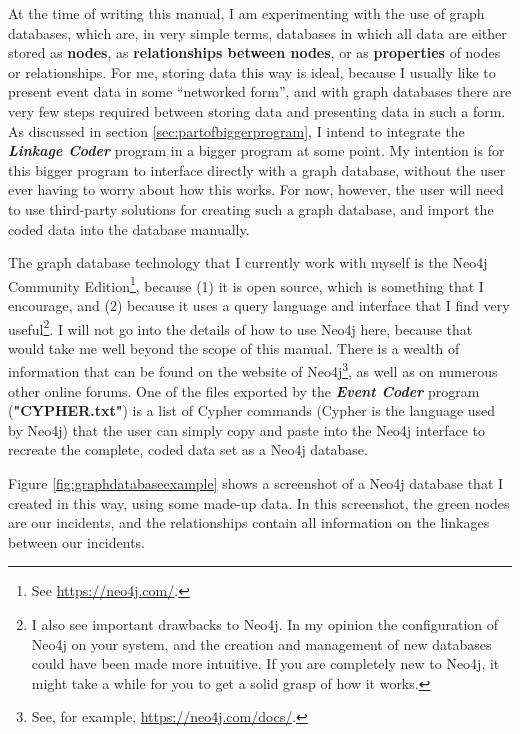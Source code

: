 \documentclass{memoir}
\begin{document}
At the time of writing this manual, I am experimenting with the use of graph databases, which are, in very simple terms, databases in which all data are either stored as \textbf{nodes}, as \textbf{relationships between nodes}, or as \textbf{properties} of nodes or relationships. For me, storing data this way is ideal, because I usually like to present event data in some ``networked form'', and with graph databases there are very few steps required between storing data and presenting data in such a form. As discussed in section \ref{sec:partofbiggerprogram}, I intend to integrate the \textbf{\emph{Linkage Coder}} program in a bigger program at some point. My intention is for this bigger program to interface directly with a graph database, without the user ever having to worry about how this works. For now, however, the user will need to use third-party solutions for creating such a graph database, and import the coded data into the database manually.

The graph database technology that I currently work with myself is the Neo4j Community Edition\footnote{See \url{https://neo4j.com/}.}, because (1) it is open source, which is something that I encourage, and (2) because it uses a query language and interface that I find very useful\footnote{I also see important drawbacks to Neo4j. In my opinion the configuration of Neo4j on your system, and the creation and management of new databases could have been made more intuitive. If you are completely new to Neo4j, it might take a while for you to get a solid grasp of how it works.}. I will not go into the details of how to use Neo4j here, because that would take me well beyond the scope of this manual. There is a wealth of information that can be found on the website of Neo4j\footnote{See, for example, \url{https://neo4j.com/docs/}.}, as well as on numerous other online forums. One of the files exported by the \emph{\textbf{Event Coder}} program (\textbf{"CYPHER.txt"}) is a list of Cypher commands (Cypher is the language used by Neo4j) that the user can simply copy and paste into the Neo4j interface to recreate the complete, coded data set as a Neo4j database.    

Figure \ref{fig:graphdatabaseexample} shows a screenshot of a Neo4j database that I created in this way, using some made-up data. In this screenshot, the green nodes are our incidents, and the relationships contain all information on the linkages between our incidents.
\end{document}
